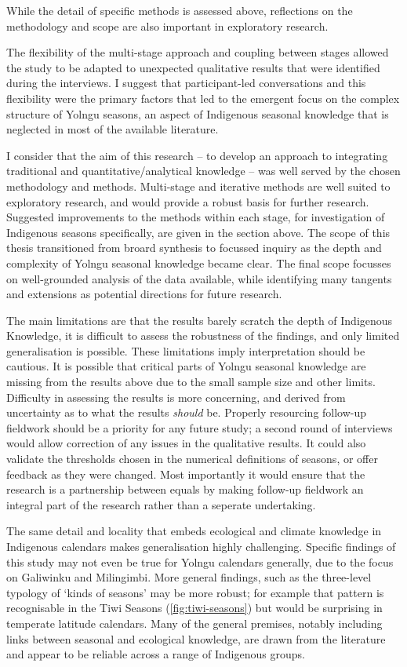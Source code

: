While the detail of specific methods is assessed above, reflections on the
methodology and scope are also important in exploratory research.

The flexibility of the multi-stage approach and coupling between stages
allowed the study to be adapted to unexpected qualitative results that were
identified during the interviews.  I suggest
that participant-led conversations and this flexibility were the primary
factors that led to the emergent focus on the complex structure of
Yolngu seasons, an aspect of Indigenous seasonal knowledge that is neglected
in most of the available literature.

I consider that the aim of this research -- to develop an approach to
integrating traditional and quantitative/analytical knowledge -- was well
served by the chosen methodology and methods.  Multi-stage and iterative
methods are well suited to exploratory research, and would provide a robust
basis for further research.  Suggested improvements to the methods within
each stage, for investigation of Indigenous seasons specifically, are given
in the section above.  The scope of this thesis transitioned from broard
synthesis to focussed inquiry as the depth and complexity of Yolngu seasonal
knowledge became clear.  The final scope focusses on well-grounded analysis
of the data available, while identifying many tangents and extensions as
potential directions for future research.

The main limitations are that the results barely scratch
the depth of Indigenous Knowledge, it is difficult to assess the robustness
of the findings, and only limited generalisation is possible.  These
limitations imply interpretation should be cautious.  It is possible that
critical parts of Yolngu seasonal knowledge are missing from the results
above due to the small sample size and other limits.
%
Difficulty in assessing the results is more concerning, and derived from
uncertainty as to what the results \textit{should} be.   Properly resourcing
follow-up fieldwork should be a priority for any future study; a second round
of interviews would allow correction of any issues in the qualitative results.
It could also validate the thresholds chosen in the numerical definitions of
seasons, or offer feedback as they were changed.  Most importantly it would
ensure that the research is a partnership between equals by making follow-up
fieldwork an integral part of the research rather than a seperate undertaking.

The same detail and locality that embeds ecological and climate knowledge in
Indigenous calendars makes generalisation highly challenging.  Specific
findings of this study may not even be true for Yolngu calendars generally,
due to the focus on Galiwinku and Milingimbi.  More general findings, such as
the three-level typology of `kinds of seasons' may be more robust; for example
that pattern is recognisable in the Tiwi Seasons (\cref{fig:tiwi-seasons})
but would be surprising in temperate latitude calendars.  Many of the general premises, notably
including links between seasonal and ecological knowledge, are drawn from the
literature and appear to be reliable across a range of Indigenous groups.




